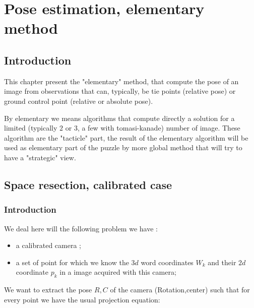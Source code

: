 
\chapter{Pose estimation, elementary method}



\section{Introduction}

This chapter present the "elementary" method, that compute the pose of an image
from observations that can, typically, be tie points (relative pose) or 
ground control point (relative or absolute pose).

By elementary we means algorithms that compute directly a solution for a limited
(typically $2$ or $3$, a few with tomasi-kanade) number of image. These algorithm
are the "tacticle" part, the result of the elementary algorithm will be used as
elementary part of the puzzle by more global method that will try to have a "strategic"  view.



\section{Space resection, calibrated case}


\subsection{Introduction}

We deal here will the following problem  we have :

\begin{itemize}
   \item a calibrated camera ;
   \item a set of point for which we know the  $3d$ word coordinates $W_k$ and their 
        $2d$ coordinate $p_k$ in a image acquired with this camera;
\end{itemize}

We want to extract the pose $R,C$ of the camera (Rotation,center) such that for every point
we have the usual projection equation:


